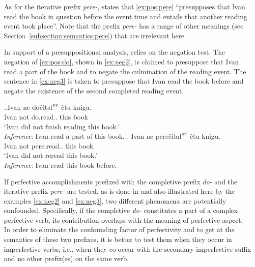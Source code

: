 As for the iterative prefix \textit{pere-}, \citet[145]{Kagan:book} states that \ref{ex:pos:pere} ``presupposes that Ivan read the book in question before the event time and entails that another reading event took place''. Note that the prefix \textit{pere-} has a range of other meanings (see Section~\ref{subsection:semantics:pere}) that are irrelevant here.

In support of a presuppositional analysis, \citet{Kagan:book} relies on the negation test. The negation of \ref{ex:pos:do}, shown in \ref{ex:neg2}, is claimed to presuppose that Ivan read a part of the book and to negate the culmination of the reading event. The sentence in \ref{ex:neg3} is taken to presuppose that Ivan read the book before and negate the existence of the second completed reading event.

\ex.\ag.\label{ex:neg2}Ivan ne do\v{c}ital$^{\textsc{pf}}$ \`{e}tu knigu.\\
Ivan not do.read.. this book\\
\trans `Ivan did not finish reading this book.'\\
\textit{Inference}: Ivan read a part of this book.
\bg. \label{ex:neg3}Ivan ne pere\v{c}ital$^{\textsc{pf}}$ \`{e}tu knigu.\\
Ivan not pere.read.. this book\\
\trans `Ivan did not reread this book.'\\
\textit{Inference}: Ivan read this book before.

If perfective accomplishments prefixed with the completive prefix \textit{do-} and the iterative prefix \textit{pere-} are tested, as is done in \citealt{Kagan:book} and also illustrated here by the examples \ref{ex:neg2} and \ref{ex:neg3}, two different phenomena are potentially confounded. Specifically, if the completive \textit{do-} constitutes a part of a complex perfective verb, its contribution overlaps with the meaning of perfective aspect. In order to eliminate the confounding factor of perfectivity and to get at the semantics of these two prefixes, it is better to test them when they occur in imperfective verbs, i.e., when they co-occur with the secondary imperfective suffix and no other prefix(es) on the same verb.

